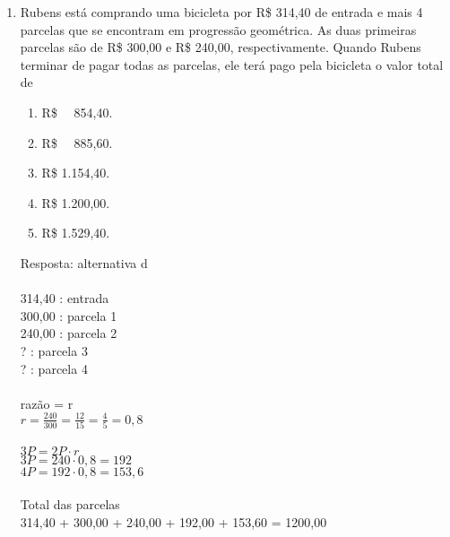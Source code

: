 \documentclass[a4paper,14pt]{article}
\begin{document}
\begin{enumerate}
        \item Rubens está comprando uma bicicleta por R\$ 314,40 de entrada e mais 4 parcelas que se encontram
        em progressão geométrica. As duas primeiras parcelas são de R\$ 300,00 e R\$ 240,00, respectivamente.
        Quando Rubens terminar de pagar todas as parcelas, ele terá pago pela bicicleta o valor total de
        \begin{enumerate}
        	\item R\$ ~~854,40.
        	\item R\$ ~~885,60.
        	\item R\$ 1.154,40.
        	\item R\$ 1.200,00.
        	\item R\$ 1.529,40.
        \end{enumerate}
        Resposta: alternativa d \\ \\
        314,40 : entrada \\
        300,00 : parcela 1 \\
        240,00 : parcela 2 \\
        ? : parcela 3 \\
        ? : parcela 4 \\
        \\
        razão = r \\
        $r = \frac{240}{300} = \frac{12}{15} = \frac{4}{5} = 0,8$ \\ \\
        $3P = 2P \cdot r$ \\
        $3P = 240 \cdot 0,8 = 192$ \\
        $4P = 192 \cdot 0,8 = 153,6$ \\
        \\ Total das parcelas \\
        314,40 + 300,00 + 240,00 + 192,00 + 153,60 = 1200,00 
        
        \vspace{0cm}
        

\end{enumerate}
\end{document}
